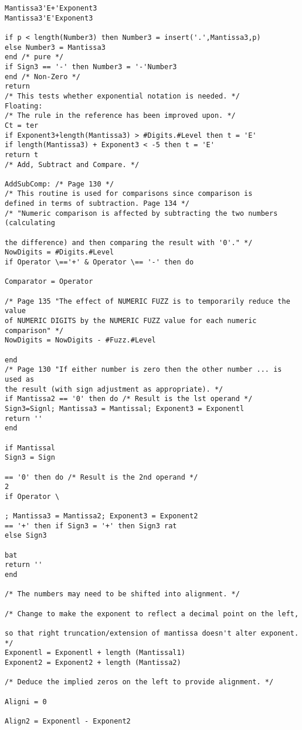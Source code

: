 \begin{verbatim}
Mantissa3'E+'Exponent3
Mantissa3'E'Exponent3

if p < length(Number3) then Number3 = insert('.',Mantissa3,p)
else Number3 = Mantissa3
end /* pure */
if Sign3 == '-' then Number3 = '-'Number3
end /* Non-Zero */
return
/* This tests whether exponential notation is needed. */
Floating:
/* The rule in the reference has been improved upon. */
Ct = ter
if Exponent3+length(Mantissa3) > #Digits.#Level then t = 'E'
if length(Mantissa3) + Exponent3 < -5 then t = 'E'
return t
/* Add, Subtract and Compare. */

AddSubComp: /* Page 130 */
/* This routine is used for comparisons since comparison is
defined in terms of subtraction. Page 134 */
/* "Numeric comparison is affected by subtracting the two numbers (calculating

the difference) and then comparing the result with '0'." */
NowDigits = #Digits.#Level
if Operator \=='+' & Operator \== '-' then do

Comparator = Operator

/* Page 135 "The effect of NUMERIC FUZZ is to temporarily reduce the value
of NUMERIC DIGITS by the NUMERIC FUZZ value for each numeric comparison" */
NowDigits = NowDigits - #Fuzz.#Level

end
/* Page 130 "If either number is zero then the other number ... is used as
the result (with sign adjustment as appropriate). */
if Mantissa2 == '0' then do /* Result is the lst operand */
Sign3=Signl; Mantissa3 = Mantissal; Exponent3 = Exponentl
return ''
end

if Mantissal
Sign3 = Sign

== '0' then do /* Result is the 2nd operand */
2
if Operator \

; Mantissa3 = Mantissa2; Exponent3 = Exponent2
== '+' then if Sign3 = '+' then Sign3 rat
else Sign3

bat
return ''
end

/* The numbers may need to be shifted into alignment. */

/* Change to make the exponent to reflect a decimal point on the left,

so that right truncation/extension of mantissa doesn't alter exponent. */
Exponentl = Exponentl + length (Mantissal1)
Exponent2 = Exponent2 + length (Mantissa2)

/* Deduce the implied zeros on the left to provide alignment. */

Aligni = 0

Align2 = Exponentl - Exponent2


\end{verbatim}

